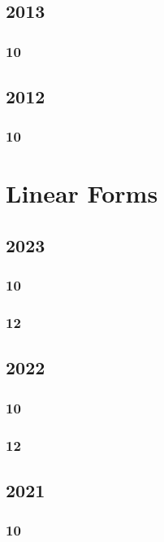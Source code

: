 \documentclass[11pt]{book}
\begin{document}
\section{2013}
\subsection{10}

\section{2012}
\subsection{10}




\chapter{Linear Forms}
\section{2023}
\subsection{10}

\subsection{12}                                                                                                  

\section{2022}
\subsection{10}

\subsection{12}

\section{2021}
\subsection{10}

\end{document}
